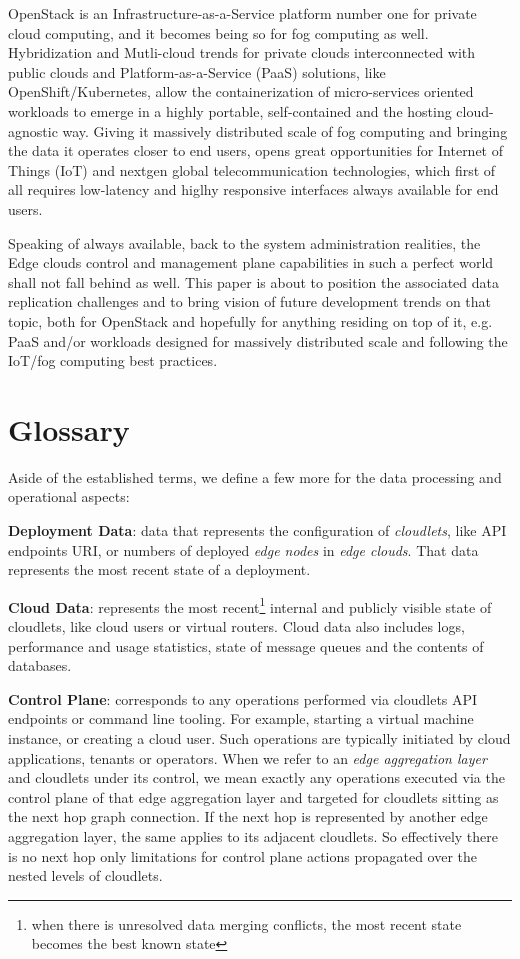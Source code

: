 \documentclass[conference]{IEEEtran}
\begin{document}
OpenStack is an Infrastructure-as-a-Service platform number one for private
cloud computing, and it becomes being so for fog computing as well.
Hybridization and Mutli-cloud trends for private clouds interconnected with
public clouds and Platform-as-a-Service (PaaS) solutions, like
OpenShift/Kubernetes, allow the containerization of micro-services oriented
workloads to emerge in a highly portable, self-contained and the hosting
cloud-agnostic way. Giving it massively distributed scale of fog computing and
bringing the data it operates closer to end users, opens great opportunities
for Internet of Things (IoT) and nextgen global telecommunication technologies,
which first of all requires low-latency and higlhy responsive interfaces always
available for end users.

Speaking of always available, back to the system administration realities, the
Edge clouds control and management plane capabilities in such a perfect world
shall not fall behind as well. This paper is about to position the associated
data replication challenges and to bring vision of future development trends on
that topic, both for OpenStack and hopefully for anything residing on top of
it, e.g. PaaS and/or workloads designed for massively distributed scale and
following the IoT/fog computing best practices.

\section{Glossary}

Aside of the established terms\cite{b3}, we define a few more for the data
processing and operational aspects:

\textbf{Deployment Data}: data that represents the configuration of
\textit{cloudlets}\cite{b3}, like API endpoints URI, or numbers of deployed
\textit{edge nodes}\cite{b3} in \textit{edge clouds}\cite{b3}. That data
represents the most recent state of a deployment.

\textbf{Cloud Data}: represents the most recent\footnote{when there is
unresolved data merging conflicts, the most recent state becomes the best known
state} internal and publicly visible state of cloudlets, like cloud users or
virtual routers. Cloud data also includes logs, performance and usage
statistics, state of message queues and the contents of databases.

\textbf{Control Plane}: corresponds to any operations performed via cloudlets
API endpoints or command line tooling. For example, starting a virtual machine
instance, or creating a cloud user. Such operations are typically initiated by
cloud applications, tenants or operators. When we refer to an \textit{edge
aggregation layer}\cite{b3} and cloudlets under its control, we mean exactly
any operations executed via the control plane of that edge aggregation layer
and targeted for cloudlets sitting as the next hop graph connection. If the
next hop is represented by another edge aggregation layer, the same applies to
its adjacent cloudlets. So effectively there is no next hop only limitations
for control plane actions propagated over the nested levels of cloudlets.
\end{document}
